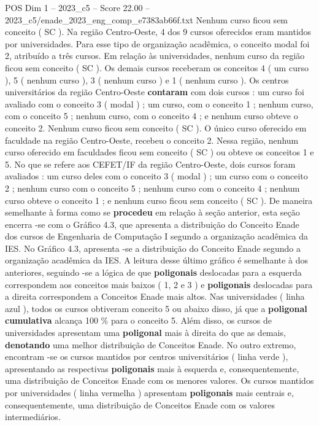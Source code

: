 \begin{textsample}{POS Dim 1 – 2023\_c5 – Score 22.00 – 2023\_c5/enade\_2023\_eng\_comp\_e7383ab66f.txt}
Nenhum curso ficou sem conceito ( SC ).
Na região Centro-Oeste, 4 dos 9 cursos oferecidos eram mantidos por universidades.
Para esse tipo de organização acadêmica, o conceito modal foi 2, atribuído a três cursos.
Em relação às universidades, nenhum curso da região ficou sem conceito ( SC ).
Os demais cursos receberam os conceitos 4 ( um curso ), 5 ( nenhum curso ), 3 ( nenhum curso ) e 1 ( nenhum curso ).
Os centros universitários da região Centro-Oeste \textbf{contaram} com dois cursos : um curso foi avaliado com o conceito 3 ( modal ) ; um curso, com o conceito 1 ; nenhum curso, com o conceito 5 ; nenhum curso, com o conceito 4 ; e nenhum curso obteve o conceito 2.
Nenhum curso ficou sem conceito ( SC ).
O único curso oferecido em faculdade na região Centro-Oeste, recebeu o conceito 2.
Nessa região, nenhum curso oferecido em faculdades ficou sem conceito ( SC ) ou obteve os conceitos 1 e 5.
No que se refere aos CEFET/IF da região Centro-Oeste, dois cursos foram avaliados : um curso deles com o conceito 3 ( modal ) ; um curso com o conceito 2 ; nenhum curso com o conceito 5 ; nenhum curso com o conceito 4 ; nenhum curso obteve o conceito 1 ; e nenhum curso ficou sem conceito ( SC ).
De maneira semelhante à forma como se \textbf{procedeu} em relação à seção anterior, esta seção encerra -se com o Gráfico 4.3, que apresenta a distribuição do Conceito Enade dos cursos de Engenharia de Computação I segundo a organização acadêmica da IES.
No Gráfico 4.3, apresenta -se a distribuição do Conceito Enade segundo a organização acadêmica da IES.
A leitura desse último gráfico é semelhante à dos anteriores, seguindo -se a lógica de que \textbf{poligonais} deslocadas para a esquerda correspondem aos conceitos mais baixos ( 1, 2 e 3 ) e \textbf{poligonais} deslocadas para a direita correspondem a Conceitos Enade mais altos.
Nas universidades ( linha azul ), todos os cursos obtiveram conceito 5 ou abaixo disso, já que a \textbf{poligonal} \textbf{cumulativa} alcança 100 \% para o conceito 5.
Além disso, os cursos de universidades apresentam uma \textbf{poligonal} mais à direita do que as demais, \textbf{denotando} uma melhor distribuição de Conceitos Enade.
No outro extremo, encontram -se os cursos mantidos por centros universitários ( linha verde ), apresentando as respectivas \textbf{poligonais} mais à esquerda e, consequentemente, uma distribuição de Conceitos Enade com os menores valores.
Os cursos mantidos por universidades ( linha vermelha ) apresentam \textbf{poligonais} mais centrais e, consequentemente, uma distribuição de Conceitos Enade com os valores intermediários.

\end{textsample}
